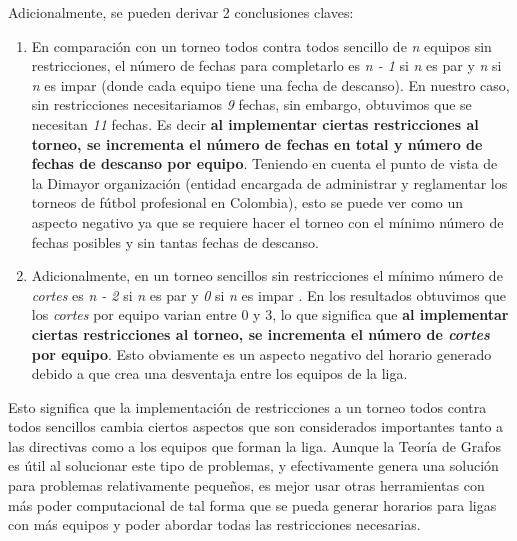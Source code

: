 \documentclass[11pt]{article}
\begin{document}
\begin{multicols}{2}
            Adicionalmente, se pueden derivar 2 conclusiones claves:
            \begin{enumerate}
                \item En comparación con un torneo todos contra todos sencillo de \textit{n} equipos sin restricciones, el número de fechas para completarlo es \textit{n - 1} si \textit{n} es par y \textit{n} si \textit{n} es impar (donde cada equipo tiene una fecha de descanso).
                En nuestro caso, sin restricciones necesitariamos \textit{9} fechas, sin embargo, obtuvimos que se necesitan \textit{11} fechas. Es decir \textbf{al implementar ciertas restricciones al torneo, se incrementa el número de fechas en total y número de fechas de descanso por equipo}.
                Teniendo en cuenta el punto de vista de la Dimayor organización (entidad encargada de administrar y reglamentar los torneos de fútbol profesional en Colombia), 
                esto se puede ver como un aspecto negativo ya que se requiere hacer el torneo con el mínimo número de fechas posibles y sin tantas fechas de descanso.
                \item Adicionalmente, en un torneo sencillos sin restricciones el mínimo número de \textit{cortes} es \textit{n - 2} si \textit{n} es par y \textit{0} si \textit{n} es impar \cite{de1988some}.  
                En los resultados obtuvimos que los \textit{cortes} por equipo varian entre 0 y 3, lo que significa que \textbf{al implementar ciertas restricciones al torneo, se incrementa el número de \textit{cortes} por equipo}.
                Esto obviamente es un aspecto negativo del horario generado debido a que crea una desventaja entre los equipos de la liga.             
            \end{enumerate}
            
            Esto significa que la implementación de restricciones a un torneo todos contra todos sencillos cambia ciertos aspectos que son considerados importantes tanto a las directivas como a los equipos que forman la liga.
            Aunque la Teoría de Grafos es útil al solucionar este tipo de problemas, y efectivamente genera una solución para problemas relativamente pequeños, es mejor usar otras herramientas con más poder computacional de 
            tal forma que se pueda generar horarios para ligas con más equipos y poder abordar todas las restricciones necesarias.  
            
        
        
        \nocite{lewis2011application}
        \nocite{de1990constrained}
        \nocite{hoshino2013graph}
    \end{multicols}
\end{document}
